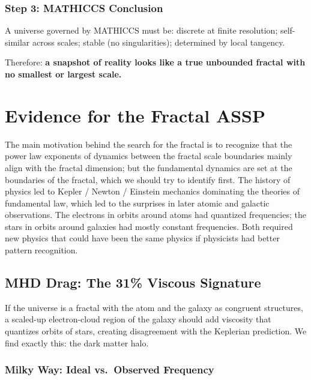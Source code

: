 \documentclass[11pt,a4paper]{article}
\begin{document}
\subsubsection{Step 3: MATHICCS Conclusion}
A universe governed by MATHICCS must be: discrete at finite resolution;
self-similar across scales; stable (no singularities); determined by local
tangency.

Therefore: \textbf{a snapshot of reality looks like a true unbounded fractal
with no smallest or largest scale.}


\section{Evidence for the Fractal ASSP}

The main motivation behind the search for the fractal is to recognize that the
power law exponents of dynamics between the fractal scale boundaries mainly align
with the fractal dimension; but the fundamental dynamics are set at the boundaries
of the fractal, which we should try to identify first. The history of physics led
to Kepler / Newton / Einstein mechanics dominating the theories of fundamental law,
which led to the surprises in later atomic and galactic observations. The electrons
in orbits around atoms had quantized frequencies; the stars in orbits around
galaxies had mostly constant frequencies. Both required new physics that could have
been the same physics if physicists had better pattern recognition.

\subsection{MHD Drag: The 31\% Viscous Signature}

If the universe is a fractal with the atom and the galaxy as congruent structures,
a scaled-up electron-cloud region of the galaxy should add viscosity that quantizes
orbits of stars, creating disagreement with the Keplerian prediction. We find
exactly this: the dark matter halo.

\subsubsection{Milky Way: Ideal vs.\ Observed Frequency}
\end{document}
